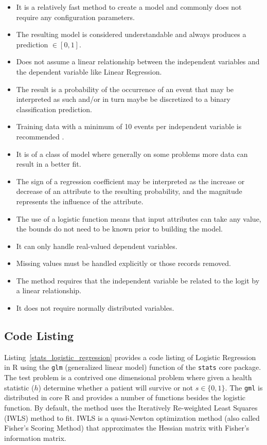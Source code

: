 \begin{itemize}
	\item It is a relatively fast method to create a model and commonly does not require any configuration parameters.
	\item The resulting model is considered understandable and always produces a prediction $\in[0,1]$.	
	\item Does not assume a linear relationship between the independent variables and the dependent variable like Linear Regression. 
	\item The result is a probability of the occurrence of an event that may be interpreted as such and/or in turn maybe be discretized to a binary classification prediction.
	\item Training data with a minimum of 10 events per independent variable is recommended \cite{Peduzzi1996}.
	\item It is of a class of model where generally on some problems more data can result in a better fit.
	\item The sign of a regression coefficient may be interpreted as the increase or decrease of an attribute to the resulting probability, and the magnitude represents the influence of the attribute.
	\item The use of a logistic function means that input attributes can take any value, the bounds do not need to be known prior to building the model.
	\item It can only handle real-valued dependent variables.
	\item Missing values must be handled explicitly or those records removed.
	\item The method requires that the independent variable be related to the logit by a linear relationship.
	\item It does not require normally distributed variables.	
\end{itemize}


\subsection{Code Listing}
Listing~\ref{stats_logistic_regression} provides a code listing of Logistic Regression in R using the \texttt{glm} (generalized linear model) function of the \texttt{stats} core package. 
The test problem is a contrived one dimensional problem where given a health statistic ($h$) determine whether a patient will survive or not $s\in\{0,1\}$.
The \texttt{gml} is distributed in core R and provides a number of functions besides the logistic function. By default, the method uses the Iteratively Re-weighted Least Squares (IWLS) method to fit. IWLS is a quasi-Newton optimization method (also called Fisher's Scoring Method) that approximates the Hessian matrix with Fisher's information matrix.


